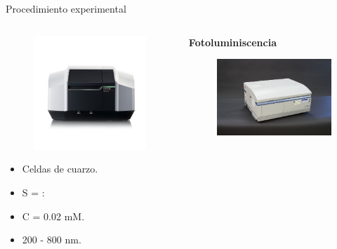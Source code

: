\documentclass[handout]{beamer}
\begin{document}
\begin{frame}{Procedimiento experimental}
\begin{columns}
\begin{column}{0.25\linewidth}
\begin{figure}[h]
				\includegraphics[width=\textwidth]{sources/uvviseq}
			\end{figure}
			\tiny
			\begin{itemize}
				\item Celdas de cuarzo.
				\item S =  : 
				\item C = 0.02 mM.
				\item 200 - 800 nm.
			\end{itemize}
		\end{column}
		\begin{column}{0.25\linewidth}
			\textbf{Fotoluminiscencia}
			\begin{figure}[h]
				\centering
				\includegraphics[width=\textwidth]{sources/fluorescence}

\end{figure}
\end{column}
\end{columns}
\end{frame}
\end{document}
